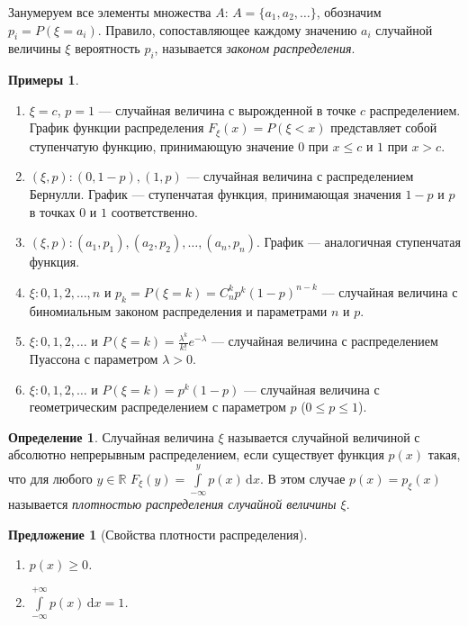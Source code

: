 \documentclass[11pt,openany,a4paper]{scrartcl}
\theoremstyle{plain}
\newtheorem{proposition}[theorem]{Предложение}
\theoremstyle{definition}
\newtheorem{definition}[theorem]{Определение}
\newtheorem{examples}[theorem]{Примеры}
\newcommand\mb{\mathbb}
\newcommand\real{\mb R}
\newcommand{\dif}{\, \mathrm d}
\newcommand{\funcdistr}{F_\xi}
\begin{document}
Занумеруем все элементы множества $A$: $A = \{a_1, a_2,\ldots\}$, обозначим
$p_i = P(\xi = a_i)$. Правило, сопоставляющее каждому значению $a_i$ случайной
величины $\xi$ вероятность $p_i$, называется \emph{законом распределения}.
\begin{examples}
    \begin{enumerate}
        \item $\xi = c$, $p = 1$ — случайная величина с вырожденной в точке
        $c$ распределением. График функции распределения $\funcdistr(x) =
        P(\xi < x)$ представляет собой ступенчатую функцию, принимающую
        значение $0$ при $x \leqslant c$ и $1$ при $x > c$.
        \item $(\xi, p): (0, 1-p), (1, p)$ — случайная величина с
        распределением Бернулли. График — ступенчатая функция, принимающая значения
        $1-p$ и $p$ в точках $0$ и $1$ соответственно.
        \item $(\xi, p): (a_1, p_1), (a_2, p_2), \ldots, (a_n, p_n)$. График —
        аналогичная ступенчатая функция.
        \item $\xi: 0, 1, 2, \ldots, n$ и $p_k = P(\xi = k) = C_n^k p^k(1-p)^{n-k}$ 
        — случайная величина с биномиальным законом распределения и
        параметрами $n$ и $p$.
        \item $\xi: 0, 1, 2, \ldots$ и
        $P(\xi = k) = \frac{\lambda^k}{k!}e^{-\lambda}$ — случайная величина
        с распределением Пуассона с параметром $\lambda > 0$.
        \item $\xi: 0, 1, 2, \ldots$ и $P(\xi = k) = p^k(1-p)$ —
        случайная величина с геометрическим распределением с параметром
        $p$ ($0 \leqslant p \leqslant 1$).
    \end{enumerate}
\end{examples}
\begin{definition}
    Случайная величина $\xi$ называется случайной величиной с абсолютно 
    непрерывным распределением, если существует функция $p(x)$ такая, что
    для любого $y \in \real$ $F_\xi(y) = \int\limits_{-\infty}^y p(x) \dif x$.
    В этом случае $p(x) = p_\xi(x)$ называется \emph{плотностью распределения 
    случайной величины $\xi$}.
\end{definition}
\begin{proposition}[Свойства плотности распределения]
    \begin{enumerate}
        \item $p(x) \geqslant 0$.
        \item $\int\limits_{-\infty}^{+\infty} p(x) \dif x = 1$.
    \end{enumerate}
\end{proposition}
\end{document}
